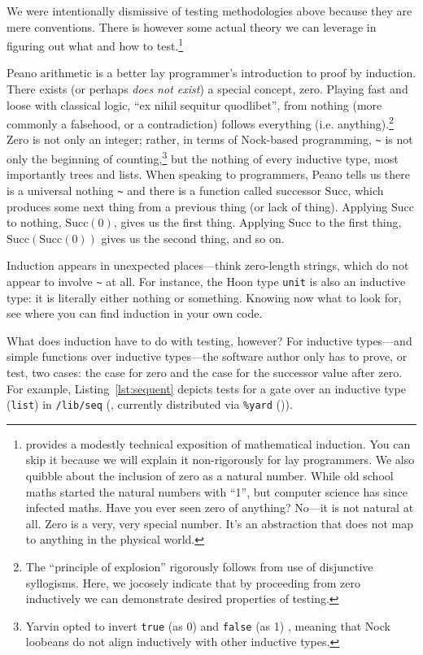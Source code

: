 \documentclass[twoside]{article}
\begin{document}
We were intentionally dismissive of testing methodologies above because they are mere conventions. There is however some actual theory we can leverage in figuring out what and how to test.\footnote{\citet{WikipediaInduction} provides a modestly technical exposition of mathematical induction. You can skip it because we will explain it non-rigorously for lay programmers. We also quibble about the inclusion of zero as a natural number. While old school maths started the natural numbers with “1”, but computer science has since infected maths. Have you ever seen zero of anything? No—it is not natural at all. Zero is a very, very special number. It's an abstraction that does not map to anything in the physical world.}

Peano arithmetic is a better lay programmer's introduction to proof by induction. There exists (or perhaps \emph{does not exist}) a special concept, zero. Playing fast and loose with classical logic, “ex nihil sequitur quodlibet”, from nothing (more commonly a falsehood, or a contradiction) follows everything (i.e. anything).\footnote{The “principle of explosion” rigorously follows from use of disjunctive syllogisms.  Here, we jocosely indicate that by proceeding from zero inductively we can demonstrate desired properties of testing.} Zero is not only an integer; rather, in terms of Nock-based programming, \lstinline[style=inlinecode]{~} is not only the beginning of counting,\footnote{Yarvin opted to invert \texttt{true} (as 0) and \texttt{false} (as 1) \citep{Yarvin2006}, meaning that Nock loobeans do not align inductively with other inductive types.} but the nothing of every inductive type, most importantly trees and lists. When speaking to programmers, Peano tells us there is a universal nothing \lstinline[style=inlinecode]{~} and there is a function called successor $\textrm{Succ}$, which produces some next thing from a previous thing (or lack of thing). Applying $\textrm{Succ}$ to nothing, $\textrm{Succ}(0)$, gives us the first thing.  Applying $\textrm{Succ}$ to the first thing, $\textrm{Succ}(\textrm{Succ}(0))$ gives us the second thing, and so on.

Induction appears in unexpected places—think zero-length strings, which do not appear to involve \lstinline[style=inlinecode]{~} at all. For instance, the Hoon type \texttt{unit} is also an inductive type: it is literally either nothing or something. Knowing now what to look for, see where you can find induction in your own code.

What does induction have to do with testing, however?  For inductive types—and simple functions over inductive types—the software author only has to prove, or test, two cases:  the case for zero and the case for the successor value after zero.  For example, Listing~\ref{lst:sequent} depicts tests for a gate over an inductive type (\texttt{list}) in \texttt{/lib/seq} (, currently distributed via \texttt{\%yard} ()).
\end{document}
